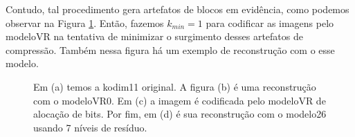 Contudo, tal procedimento gera artefatos de blocos em evidência, como podemos observar na Figura \ref{fig:artefatos}. 
Então, fazemos $k_{min}=1$ para codificar as imagens pelo modeloVR na tentativa de minimizar o surgimento desses artefatos de compressão. Também nessa figura há um exemplo de reconstrução com o esse modelo.  


\begin{figure}[h]
	\centering
	\hfill
	
	\hfill
	\caption[Surgimento de artefatos de blocos no método alocação de bits.]{Em (a) temos a kodim11 original. A figura (b) é uma reconstrução com o modeloVR0. Em (c) a imagem é codificada pelo modeloVR de alocação de bits. Por fim, em (d) é sua reconstrução com o modelo26 usando 7 níveis de resíduo.}
		\label{fig:artefatos}
\end{figure}

